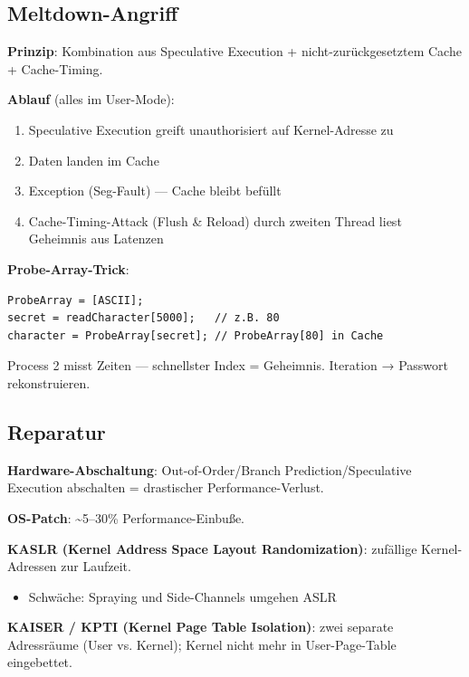 \documentclass[11pt, a4paper]{article}
\begin{document}
\subsection{Meltdown-Angriff}

\textbf{Prinzip}: Kombination aus Speculative Execution + nicht-zurückgesetztem Cache + Cache-Timing.


\textbf{Ablauf} (alles im User-Mode):

\begin{enumerate}
  \item Speculative Execution greift unauthorisiert auf Kernel-Adresse zu
  \item Daten landen im Cache
  \item Exception (Seg-Fault) — Cache bleibt befüllt
  \item Cache-Timing-Attack (Flush \& Reload) durch zweiten Thread liest Geheimnis aus Latenzen
\end{enumerate}

\textbf{Probe-Array-Trick}:

\begin{lstlisting}
ProbeArray = [ASCII];
secret = readCharacter[5000];   // z.B. 80
character = ProbeArray[secret]; // ProbeArray[80] in Cache
\end{lstlisting}

Process 2 misst Zeiten — schnellster Index = Geheimnis. Iteration → Passwort rekonstruieren.



\subsection{Reparatur}

\textbf{Hardware-Abschaltung}: Out-of-Order/Branch Prediction/Speculative Execution abschalten = drastischer Performance-Verlust.


\textbf{OS-Patch}: \textasciitilde{}5–30\% Performance-Einbuße.


\textbf{KASLR (Kernel Address Space Layout Randomization)}: zufällige Kernel-Adressen zur Laufzeit.

\begin{itemize}
  \item Schwäche: Spraying und Side-Channels umgehen ASLR
\end{itemize}

\textbf{KAISER / KPTI (Kernel Page Table Isolation)}: zwei separate Adressräume (User vs. Kernel); Kernel nicht mehr in User-Page-Table eingebettet.
\end{document}
